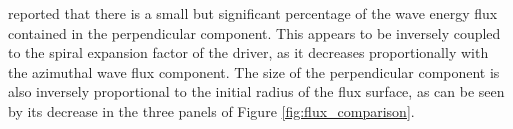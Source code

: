 \cite{Mumford2015} reported that there is a small but significant percentage of the wave energy flux contained in the perpendicular component.
This appears to be inversely coupled to the spiral expansion factor of the driver, as it decreases proportionally with the azimuthal wave flux component.
The size of the perpendicular component is also inversely proportional to the initial radius of the flux surface, as can be seen by its decrease in the three panels of Figure \ref{fig:flux_comparison}.

%
%
%
%
%
%
%
%
%    
%    
